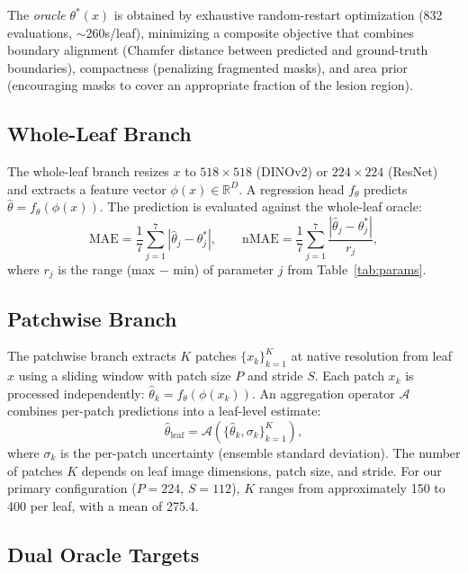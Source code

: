 \documentclass[11pt,a4paper]{article}
\newcommand{\thetastar}{\theta^{*}}
\newcommand{\thetahat}{\hat{\theta}}
\newcommand{\nMAE}{\mathrm{nMAE}}
\newcommand{\MAE}{\mathrm{MAE}}
\begin{document}
The \emph{oracle} $\thetastar(x)$ is obtained by exhaustive random-restart optimization (832 evaluations, $\sim$260s/leaf), minimizing a composite objective that combines boundary alignment (Chamfer distance between predicted and ground-truth boundaries), compactness (penalizing fragmented masks), and area prior (encouraging masks to cover an appropriate fraction of the lesion region).

\subsection{Whole-Leaf Branch}

The whole-leaf branch resizes $x$ to $518 \times 518$ (DINOv2) or $224 \times 224$ (ResNet) and extracts a feature vector $\phi(x) \in \mathbb{R}^D$.
A regression head $f_\theta$ predicts $\thetahat = f_\theta(\phi(x))$.
The prediction is evaluated against the whole-leaf oracle:
\begin{equation}
\MAE = \frac{1}{7}\sum_{j=1}^{7}|\thetahat_j - \thetastar_j|, \qquad
\nMAE = \frac{1}{7}\sum_{j=1}^{7}\frac{|\thetahat_j - \thetastar_j|}{r_j},
\end{equation}
where $r_j$ is the range (max $-$ min) of parameter $j$ from Table~\ref{tab:params}.

\subsection{Patchwise Branch}

The patchwise branch extracts $K$ patches $\{x_k\}_{k=1}^K$ at native resolution from leaf $x$ using a sliding window with patch size $P$ and stride $S$.
Each patch $x_k$ is processed independently:
$\thetahat_k = f_\theta(\phi(x_k))$.
An aggregation operator $\mathcal{A}$ combines per-patch predictions into a leaf-level estimate:
\begin{equation}
\thetahat_\mathrm{leaf} = \mathcal{A}(\{\thetahat_k, \sigma_k\}_{k=1}^K),
\end{equation}
where $\sigma_k$ is the per-patch uncertainty (ensemble standard deviation).
The number of patches $K$ depends on leaf image dimensions, patch size, and stride.
For our primary configuration ($P=224$, $S=112$), $K$ ranges from approximately 150 to 400 per leaf, with a mean of 275.4.

\subsection{Dual Oracle Targets}
\label{sec:dual_oracle}
\end{document}
